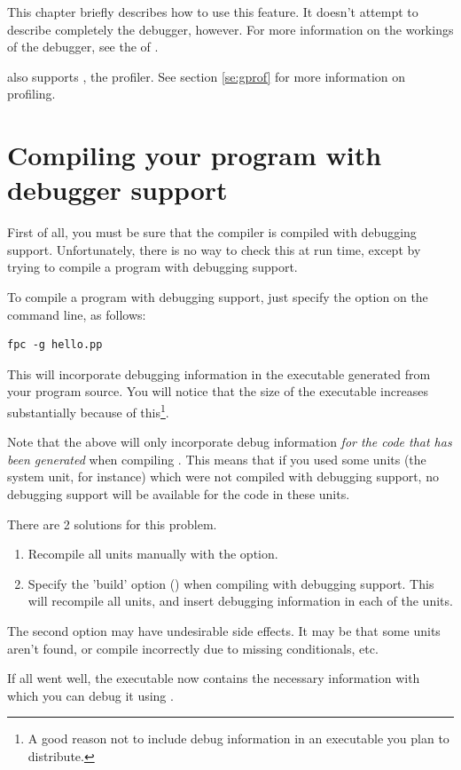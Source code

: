 This chapter briefly describes how to use this feature. It doesn't attempt
to describe completely the \gnu debugger, however.
For more information on the workings of the \gnu debugger, see the 
of \userref.

\fpc also supports , the \gnu profiler. See section \ref{se:gprof}
for more information on profiling.

\section{Compiling your program with debugger support}
First of all, you must be sure that the compiler is compiled with debugging
support. Unfortunately, there is no way to check this at run time, except by
trying to compile a program with debugging support.

To compile a program with debugging support, just specify the 
option on the command line, as follows:
\begin{verbatim}
fpc -g hello.pp
\end{verbatim}
This will incorporate debugging information in the executable generated
from your program source. You will notice that the size of the executable
increases substantially because of this\footnote{A good reason not to include debug
information in an executable you plan to distribute.}.

Note that the above will only incorporate debug information {\em for the code
that has been generated} when compiling . This means that if
you used some units (the system unit, for instance) which were not compiled
with debugging support, no debugging support will be available for the code
in these units.

There are 2 solutions for this problem.
\begin{enumerate}
\item Recompile all units manually with the  option.
\item Specify the 'build' option () when compiling with debugging
support. This will recompile all units, and insert debugging information in
each of the units.
\end{enumerate}
The second option may have undesirable side effects. It may be that some
units aren't found, or compile incorrectly due to missing conditionals,
etc.

If all went well, the executable now contains the necessary information with
which you can debug it using \gnu {}.


